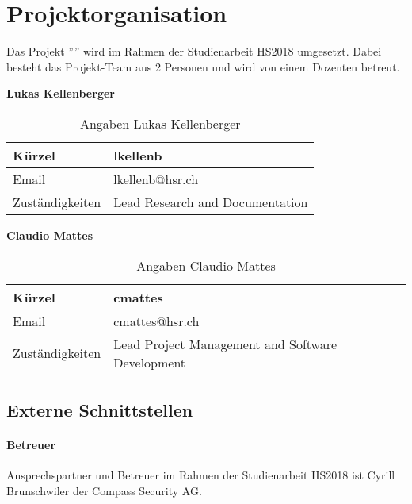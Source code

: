 \section{Projektorganisation}
Das Projekt ''\TITLE'' wird im Rahmen der Studienarbeit HS2018 umgesetzt. Dabei besteht das Projekt-Team aus 2 Personen und wird von einem Dozenten betreut.


\vspace{5mm}
\textbf{Lukas Kellenberger}

\begin{table}[H]
    \centering
    \begin{tabular}{p{4cm} p{8cm}} \hline
        Kürzel & lkellenb  \\ \hline
        Email & lkellenb@hsr.ch  \\ \hline
        Zuständigkeiten & Lead Research and Documentation \\ \hline
    \end{tabular}
    \caption{Angaben Lukas Kellenberger}
\end{table}

\textbf{Claudio Mattes}

\begin{table}[H]
    \centering
    \begin{tabular}{p{4cm} p{8cm}} \hline
        Kürzel & cmattes  \\ \hline
        Email & cmattes@hsr.ch  \\ \hline
        Zuständigkeiten & Lead Project Management and Software Development \\ \hline
    \end{tabular}
    \caption{Angaben Claudio Mattes}
\end{table}

\subsection{Externe Schnittstellen}

\paragraph{Betreuer} Ansprechspartner und Betreuer im Rahmen der Studienarbeit HS2018 ist Cyrill Brunschwiler der Compass Security AG.